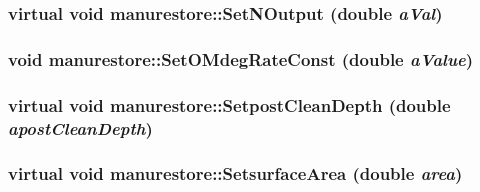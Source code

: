 \label{classmanurestore_a17d1969c7d7f39b449da52d42155f342}
\hypertarget{classmanurestore_a848644e21710c45320e36e8121232e0f}{
\subsubsection[{SetNOutput}]{\setlength{\rightskip}{0pt plus 5cm}virtual void manurestore::SetNOutput (double {\em aVal})}}
\label{classmanurestore_a848644e21710c45320e36e8121232e0f}
\hypertarget{classmanurestore_afad26ecb67219f60eeb0cd7c0aed89a3}{
\subsubsection[{SetOMdegRateConst}]{\setlength{\rightskip}{0pt plus 5cm}void manurestore::SetOMdegRateConst (double {\em aValue})}}
\label{classmanurestore_afad26ecb67219f60eeb0cd7c0aed89a3}
\hypertarget{classmanurestore_ad8bd234e6612ea15ea17795899615b41}{
\subsubsection[{SetpostCleanDepth}]{\setlength{\rightskip}{0pt plus 5cm}virtual void manurestore::SetpostCleanDepth (double {\em apostCleanDepth})}}
\label{classmanurestore_ad8bd234e6612ea15ea17795899615b41}
\hypertarget{classmanurestore_ad6e7d11021d7b76a7f8682621403a653}{
\subsubsection[{SetsurfaceArea}]{\setlength{\rightskip}{0pt plus 5cm}virtual void manurestore::SetsurfaceArea (double {\em area})}}
\label{classmanurestore_ad6e7d11021d7b76a7f8682621403a653}
